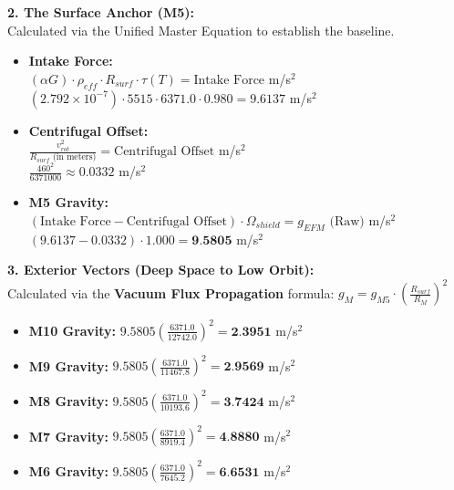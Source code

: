 \documentclass[11pt, a4paper]{article}
\begin{document}
  \vspace{1.0em}
  \noindent \textbf{2. The Surface Anchor (M5):} \\
  \hspace*{1em} Calculated via the Unified Master Equation to establish the baseline.
  \begin{itemize}
    \item \textbf{Intake Force:} \\[0.5em]
    \hspace*{2em} $(\alpha G) \cdot \rho_{eff} \cdot R_{surf} \cdot \tau(T) = \text{Intake Force}$ m/s$^2$ \\[1em]
    \hspace*{2em} $(2.792 \times 10^{-7}) \cdot 5515 \cdot 6371.0 \cdot 0.980 = 9.6137$ m/s$^2$
    
    \item \textbf{Centrifugal Offset:} \\[0.5em]
    \hspace*{2em} $\frac{v_{rot}^2}{R_{surf} \text{ (in meters)}} = \text{Centrifugal Offset}$ m/s$^2$ \\[1em]
    \hspace*{2em} $\frac{460^2}{6371000} \approx 0.0332$ m/s$^2$
    
    \item \textbf{M5 Gravity:} \\[0.5em]
    \hspace*{2em} $(\text{Intake Force} - \text{Centrifugal Offset}) \cdot \Omega_{shield} = g_{EFM} \text{ (Raw)}$ m/s$^2$ \\[1em]
    \hspace*{2em} $(9.6137 - 0.0332) \cdot 1.000 = \textbf{9.5805}$ m/s$^2$
  \end{itemize}

  \clearpage
  \noindent \textbf{3. Exterior Vectors (Deep Space to Low Orbit):} \\
  \hspace*{1em} Calculated via the \textbf{Vacuum Flux Propagation} formula: $g_M = g_{M5} \cdot \left( \frac{R_{surf}}{R_M} \right)^2$
  \begin{itemize}
    \item \textbf{M10 Gravity:} $9.5805 \left( \frac{6371.0}{12742.0} \right)^2 = \textbf{2.3951}$ m/s$^2$
    \item \textbf{M9 Gravity:} $9.5805 \left( \frac{6371.0}{11467.8} \right)^2 = \textbf{2.9569}$ m/s$^2$
    \item \textbf{M8 Gravity:} $9.5805 \left( \frac{6371.0}{10193.6} \right)^2 = \textbf{3.7424}$ m/s$^2$
    \item \textbf{M7 Gravity:} $9.5805 \left( \frac{6371.0}{8919.4} \right)^2 = \textbf{4.8880}$ m/s$^2$
    \item \textbf{M6 Gravity:} $9.5805 \left( \frac{6371.0}{7645.2} \right)^2 = \textbf{6.6531}$ m/s$^2$
  \end{itemize}
\end{document}
